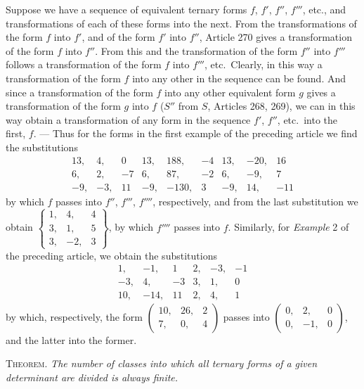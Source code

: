 Suppose we have a sequence of equivalent ternary forms \(f\), \(f'\), \(f''\), \(f'''\), etc., and transformations of each of these forms into the next. From the transformations of the form \(f\) into \(f'\), and of the form \(f'\) into \(f''\), Article 270 gives a transformation of the form \(f\) into \(f''\). From this and the transformation of the form \(f''\) into \(f'''\) follows a transformation of the form \(f\) into \(f'''\), etc.\ Clearly, in this way a transformation of the form \(f\) into any other in the sequence can be found. And since a transformation of the form \(f\) into any other equivalent form \(g\) gives a transformation of the form \(g\) into \(f\) (\(S''\) from \(S\), Articles 268, 269), we can in this way obtain a transformation of any form in the sequence \(f'\), \(f''\), etc.\ into the first, \(f\). --- Thus for the forms in the first example of the preceding article we find the substitutions
\[
\begin{array}{rrr|rrr|rrr}
13,&4,&0&13,&188,&-4&13,&-20,&16\\
6,&2,&-7&6,&87,&-2&6,&-9,&7\\
-9,&-3,&11&-9,&-130,&3&-9,&14,&-11
\end{array}
\]
by which \(f\) passes into \(f''\), \(f'''\), \(f''''\), respectively, and from the last substitution we obtain \(\left\{\begin{smallmatrix}1,&4,&4\\3,&1,&5\\3,&-2,&3\end{smallmatrix}\right\}\), by which \(f''''\) passes into \(f\). Similarly, for \emph{Example} 2 of the preceding article, we obtain the substitutions
\[
\begin{array}{rrr|rrr}
1,&-1,&1&2,&-3,&-1\\
-3,&4,&-3&3,&1,&0\\
10,&-14,&11&2,&4,&1
\end{array}
\]
by which, respectively, the form \(\left(\begin{smallmatrix}10,&26,&2\\7,&0,&4\end{smallmatrix}\right)\) passes into \(\left(\begin{smallmatrix}0,&2,&0\\0,&-1,&0\end{smallmatrix}\right)\), and the latter into the former.

\textsc{Theorem.} \emph{The number of classes into which all ternary forms of a given determinant are divided is always finite.}

